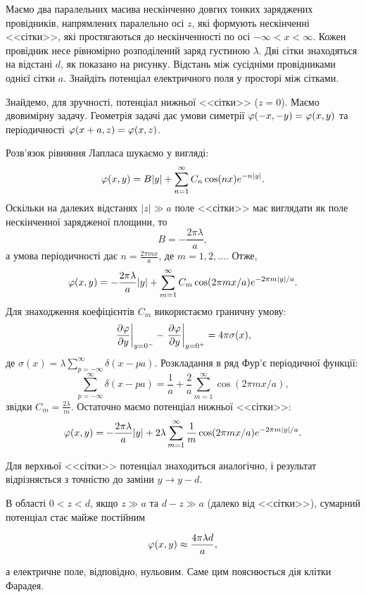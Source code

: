 \documentclass[]{ProblemBook}
\begin{document}
\begin{problem}\label{prb:Faraday_cage}
Маємо два паралельних масива нескінченно довгих тонких заряджених провідників, напрямлених паралельно осі $z$, які формують нескінченні <<сітки>>, які простягаються до нескінченності по осі $-\infty < x < \infty$. Кожен провідник несе рівномірно розподілений заряд густиною $\lambda$. Дві сітки знаходяться на відстані $d$, як показано на рисунку. Відстань між сусідніми провідниками однієї сітки $a$. Знайдіть потенціал електричного поля у просторі між сітками.
\begin{solution}
	Знайдемо, для зручності, потенціал нижньої <<сітки>> ($z = 0$). Маємо двовимірну задачу.
	Геометрія задачі дає умови симетрії $\pot(-x,-y) = \pot(x,y)$ та періодичності $\pot(x+a,z) = \pot (x,z)$.

	Розв'язок рівняння Лапласа шукаємо у  вигляді:
	\[
		\pot(x,y) = B|y| + \sum\limits_{n = 1}^{\infty} C_n\cos(nx)e^{-n|y|}.
	\]
	Оскільки на далеких відстанях $|z| \gg a$ поле <<сітки>> має виглядати як поле нескінченної зарядженої площини, то
	\[
		B = -\frac{2\pi\lambda}{a},
	\]
	а умова періодичності дає $n = \frac{2\pi mx}{a}$, де $m = 1,2, \ldots$. Отже,
	\[
		\pot(x,y) = -\frac{2\pi\lambda}{a}|y| + \sum\limits_{m = 1}^{\infty} C_m\cos(2\pi mx/a)e^{-2\pi m|y|/a}.
	\]
	Для знаходження коефіцієнтів $C_m$ використаємо граничну умову:
	\[
		\left. \frac{\partial\pot}{\partial y}\right|_{y = 0^-} - \left. \frac{\partial\pot}{\partial y}\right|_{y = 0^+} = 4\pi\sigma(x),
	\]
	де $\sigma(x) = \lambda\sum\limits_{p = -\infty}^{\infty} \delta(x - pa)$.
	Розкладання в ряд Фур'є періодичної функції:
	\[
		\sum\limits_{p = -\infty}^{\infty} \delta(x - pa) =  \frac{1}{a} + \frac{2}{a}\sum\limits_{m=1}^{\infty}\cos(2\pi mx/a),
	\]
	звідки $C_m = \frac{2\lambda}{m}$.
	Остаточно маємо потенціал нижньої <<сітки>>:
	\[
		\pot(x,y) = -\frac{2\pi\lambda}{a}|y| + 2\lambda\sum\limits_{m = 1}^{\infty} \frac1m \cos(2\pi mx/a)e^{-2\pi m|y|/a}.
	\]

	Для верхньої  <<сітки>> потенціал знаходиться аналогічно, і результат відрізняється з точністю до заміни $y \to y - d$.

	В області $0 < z <d$, якщо $z \gg a$ та $d - z \gg a$ (далеко від <<сітки>>), сумарний потенціал стає майже постійним

	\[
		\pot(x,y) \approx \frac{4\pi\lambda d}{a},
	\]

	а електричне поле, відповідно, нульовим. Саме цим пояснюється дія клітки Фарадея.

\end{solution}
\end{problem}
\end{document}

